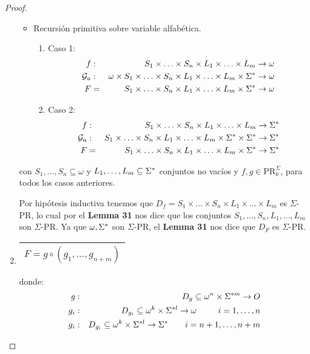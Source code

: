 \begin{proof}
\begin{enumerate}
\begin{itemize}
          \item Recursión primitiva sobre variable alfabética.
          \begin{enumerate}
            \item Caso 1:
            \begin{eqnarray*}
              f &:& S_{1} \times \dotsc \times S_{n} \times L_{1} \times \dotsc \times L_{m} \rightarrow \omega \\
              \mathcal{G}_{a} &:& \omega \times S_{1} \times \dotsc \times S_{n} \times L_{1} \times \dotsc \times L_{m}
                \times \Sigma^{\ast} \rightarrow \omega \\
              F &=& S_{1} \times \dotsc \times S_{n} \times L_{1} \times \dotsc \times L_{m} \times \Sigma^{\ast} \rightarrow
                \omega
            \end{eqnarray*}
            \item Caso 2:
            \begin{eqnarray*}
              f &:& S_{1} \times \dotsc \times S_{n} \times L_{1} \times \dotsc \times L_{m} \rightarrow \Sigma^{\ast} \\
              \mathcal{G}_{a} &:& S_{1} \times \dotsc \times S_{n} \times L_{1} \times \dotsc \times L_{m} \times \Sigma^{\ast}
                \times \Sigma^{\ast} \rightarrow \Sigma^{\ast} \\
              F &=& S_{1} \times \dotsc \times S_{n} \times L_{1} \times \dotsc \times L_{m} \times \Sigma^{\ast} \rightarrow
                \Sigma^{\ast}
            \end{eqnarray*}
          \end{enumerate}
        \end{itemize}

        \PN con $S_{1}, \dotsc, S_{n} \subseteq \omega$ y $L_{1}, \dotsc, L_{m} \subseteq \Sigma^{\ast}$ conjuntos no vacíos
        y $f, g \in \mathrm{PR}_{k}^{\Sigma}$, para todos los casos anteriores.

        \PN Por hipótesis inductiva tenemos que $D_{f} = S_{1} \times \dotsc \times S_{n} \times L_{1} \times \dotsc
        \times L_{m}$ es $\Sigma$-PR, lo cual por el \textbf{Lemma 31} nos dice que los conjuntos $S_{1}, \dotsc, S_{n},
        L_{1}, \dotsc, L_{m}$ son $\Sigma$-PR. Ya que $\omega, \Sigma^{\ast}$ son $\Sigma$-PR, el \textbf{Lemma 31} nos dice
        que $D_{F}$ es $\Sigma$-PR.

      \item \begin{tabular}{|c|} \hline $F = g \circ (g_{1}, \dotsc, g_{n+m})$ \\\hline \end{tabular} donde:
        \begin{eqnarray*}
          g &:& D_{g} \subseteq \omega^{n} \times \Sigma^{\ast m} \rightarrow O \\
          g_{i} &:& D_{g_{i}} \subseteq \omega^{k} \times \Sigma^{\ast l} \rightarrow \omega \qquad \;\; i = 1, \dotsc,
            n \\
          g_{i} &:& D_{g_{i}} \subseteq \omega^{k} \times \Sigma^{\ast l} \rightarrow \Sigma^{\ast} \qquad i = n + 1, \dotsc,
            n + m
        \end{eqnarray*}


\end{enumerate}
\end{proof}
